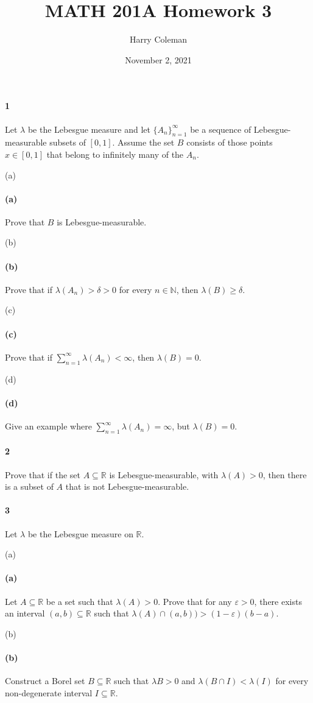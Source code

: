 \documentclass[12pt]{article}
\renewcommand{\maketitle}{\thispagestyle{title}}
\newlength{\myparskip}
\newenvironment{fullbox}{\begin{lrbox}{\savefullbox}\begin{minipage}{\dimexpr\textwidth-2\fboxsep\relax}\setlength{\parskip}{\myparskip}}{\end{minipage}\end{lrbox}\framebox[\textwidth]{\usebox{\savefullbox}}}
\newenvironment{pbox}[1][]{\begin{fullbox}\ifx#1\empty\else\paragraph{#1}\fi}{\end{fullbox}}
\newcommand{\N}{\mathbb{N}}
\newcommand{\R}{\mathbb{R}}
\newcommand{\eps}{\varepsilon}
\newcommand{\<}{\langle}
\renewcommand{\>}{\rangle}
\begin{document}
\title{MATH 201A Homework 3}
\author{Harry Coleman}
\date{November 2, 2021}
\maketitle

\begin{pbox}[1]
    Let $\lambda$ be the Lebesgue measure and let $\{A_n\}_{n=1}^{\infty}$ be a sequence of Lebesgue-measurable subsets of $[0, 1]$. Assume the set $B$ consists of those points $x \in [0, 1]$ that belong to infinitely many of the $A_n$.
\end{pbox}

\begin{pbox}[(a)]
    Prove that $B$ is Lebesgue-measurable.
\end{pbox}

\begin{pbox}[(b)]
    Prove that if $\lambda(A_n) > \delta > 0$ for every $n \in \N$, then $\lambda(B) \geq \delta$.
\end{pbox}

\begin{pbox}[(c)]
    Prove that if $\sum_{n=1}^{\infty} \lambda(A_n) < \infty$, then $\lambda(B) = 0$.
\end{pbox}

\begin{pbox}[(d)]
    Give an example where $\sum_{n=1}^{\infty} \lambda(A_n) = \infty$, but $\lambda(B) = 0$.
\end{pbox}



\begin{pbox}[2]
    Prove that if the set $A \subseteq \R$ is Lebesgue-measurable, with $\lambda(A) > 0$, then there is a subset of $A$ that is not Lebesgue-measurable.
\end{pbox}



\begin{pbox}[3]
    Let $\lambda$ be the Lebesgue measure on $\R$.
\end{pbox}

\begin{pbox}[(a)]
    Let $A \subseteq \R$ be a set such that $\lambda(A) > 0$. Prove that for any $\eps > 0$, there exists an interval $(a, b) \subseteq \R$ such that $\lambda(A) \cap (a, b)) > (1 - \eps)(b - a)$.
\end{pbox}

\begin{pbox}[(b)]
    Construct a Borel set $B \subseteq \R$ such that $\lambda B > 0$ and $\lambda(B \cap I) < \lambda(I)$ for every non-degenerate interval $I \subseteq \R$.
\end{pbox}
\end{document}
